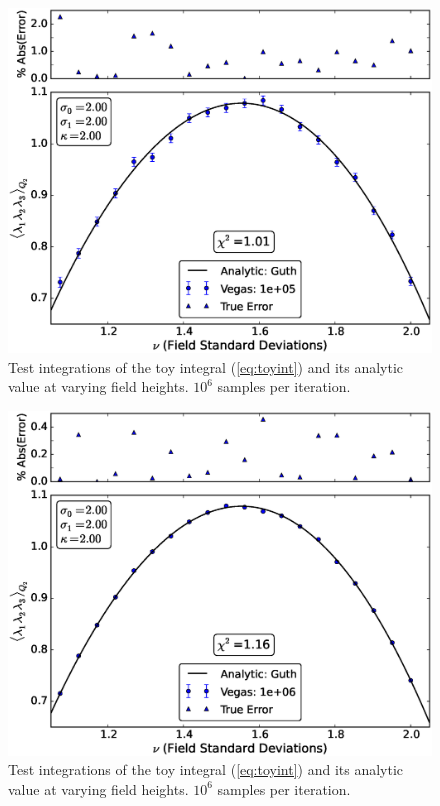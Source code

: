 \documentclass[10pt,letterpaper]{article}
\begin{document}
\begin{figure}[t] %
\centering %
\includegraphics[scale=0.45]{images/toy_pcterr_e5.eps} 
\caption{Test integrations of the toy integral (\ref{eq:toyint}) and its analytic value at varying field heights. $10^6$ samples per iteration.}
\label{fig:toy_pcterr_e5}
\end{figure}

\begin{figure}[t] %
\centering %
\includegraphics[scale=0.45]{images/toy_pcterr_e6.eps} 
\caption{Test integrations of the toy integral (\ref{eq:toyint}) and its analytic value at varying field heights. $10^6$ samples per iteration.}
\label{fig:toy_pcterr_e6}
\end{figure}
\end{document}
